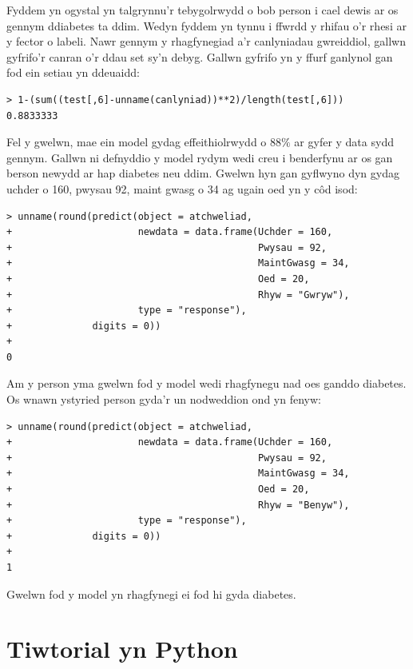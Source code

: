 Fyddem yn ogystal yn talgrynnu'r tebygolrwydd o bob person i cael dewis ar os gennym ddiabetes ta ddim. Wedyn fyddem yn tynnu i ffwrdd y rhifau o'r rhesi ar y fector o labeli. Nawr gennym y rhagfynegiad a'r canlyniadau gwreiddiol, gallwn gyfrifo'r canran o'r ddau set sy'n debyg. Gallwn gyfrifo yn y ffurf ganlynol gan fod ein setiau yn ddeuaidd:

\begin{verbatim}
> 1-(sum((test[,6]-unname(canlyniad))**2)/length(test[,6]))
0.8833333
\end{verbatim}

Fel y gwelwn, mae ein model gydag effeithiolrwydd o $88\%$ ar gyfer y data sydd gennym. Gallwn ni defnyddio y model rydym wedi creu i benderfynu ar os gan berson newydd ar hap diabetes neu ddim. Gwelwn hyn gan gyflwyno dyn gydag uchder o 160, pwysau 92, maint gwasg o 34 ag ugain oed yn y c\^{o}d isod: 

\begin{verbatim}
> unname(round(predict(object = atchweliad, 
+                      newdata = data.frame(Uchder = 160,
+                                           Pwysau = 92, 
+                                           MaintGwasg = 34, 
+                                           Oed = 20, 
+                                           Rhyw = "Gwryw"), 
+                      type = "response"),
+              digits = 0))
+ 
0
\end{verbatim}

Am y person yma gwelwn fod y model wedi rhagfynegu nad oes ganddo diabetes. Os wnawn ystyried person gyda'r un nodweddion ond yn fenyw:

\begin{verbatim}
> unname(round(predict(object = atchweliad,
+                      newdata = data.frame(Uchder = 160,
+                                           Pwysau = 92, 
+                                           MaintGwasg = 34, 
+                                           Oed = 20, 
+                                           Rhyw = "Benyw"), 
+                      type = "response"),
+              digits = 0))
+ 
1
\end{verbatim}

Gwelwn fod y model yn rhagfynegi ei fod hi gyda diabetes.

\section{Tiwtorial yn Python}

